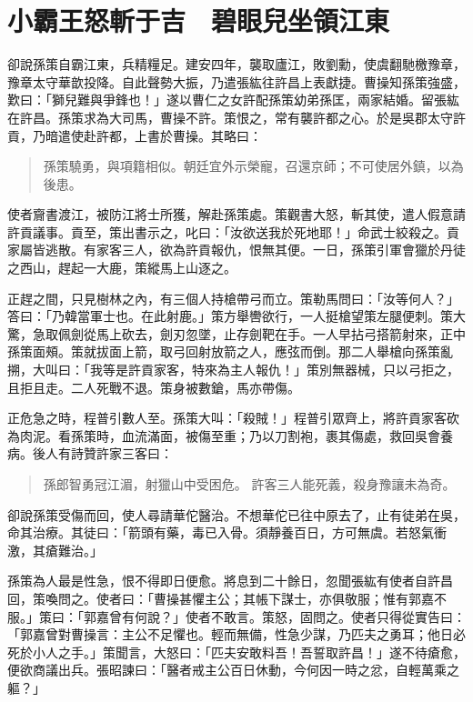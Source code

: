 
\chapter{小霸王怒斬于吉　碧眼兒坐領江東}

卻說孫策自霸江東，兵精糧足。建安四年，襲取廬江，敗劉勳，使虞翻馳檄豫章，豫章太守華歆投降。自此聲勢大振，乃遣張紘往許昌上表獻捷。曹操知孫策強盛，歎曰：「獅兒難與爭鋒也！」遂以曹仁之女許配孫策幼弟孫匡，兩家結婚。留張紘在許昌。孫策求為大司馬，曹操不許。策恨之，常有襲許都之心。於是吳郡太守許貢，乃暗遣使赴許都，上書於曹操。其略曰：

\begin{quote}
孫策驍勇，與項籍相似。朝廷宜外示榮寵，召還京師；不可使居外鎮，以為後患。
\end{quote}

使者齎書渡江，被防江將士所獲，解赴孫策處。策觀書大怒，斬其使，遣人假意請許貢議事。貢至，策出書示之，叱曰：「汝欲送我於死地耶！」命武士絞殺之。貢家屬皆逃散。有家客三人，欲為許貢報仇，恨無其便。一日，孫策引軍會獵於丹徒之西山，趕起一大鹿，策縱馬上山逐之。

正趕之間，只見樹林之內，有三個人持槍帶弓而立。策勒馬問曰：「汝等何人？」答曰：「乃韓當軍士也。在此射鹿。」策方舉轡欲行，一人挺槍望策左腿便刺。策大驚，急取佩劍從馬上砍去，劍刃忽墜，止存劍靶在手。一人早拈弓搭箭射來，正中孫策面頰。策就拔面上箭，取弓回射放箭之人，應弦而倒。那二人舉槍向孫策亂搠，大叫曰：「我等是許貢家客，特來為主人報仇！」策別無器械，只以弓拒之，且拒且走。二人死戰不退。策身被數鎗，馬亦帶傷。

正危急之時，程普引數人至。孫策大叫：「殺賊！」程普引眾齊上，將許貢家客砍為肉泥。看孫策時，血流滿面，被傷至重；乃以刀割袍，裹其傷處，救回吳會養病。後人有詩贊許家三客曰：

\begin{quote}
孫郎智勇冠江湄，射獵山中受困危。
許客三人能死義，殺身豫讓未為奇。
\end{quote}

卻說孫策受傷而回，使人尋請華佗醫治。不想華佗已往中原去了，止有徒弟在吳，命其治療。其徒曰：「箭頭有藥，毒已入骨。須靜養百日，方可無虞。若怒氣衝激，其瘡難治。」

孫策為人最是性急，恨不得即日便愈。將息到二十餘日，忽聞張紘有使者自許昌回，策喚問之。使者曰：「曹操甚懼主公；其帳下謀士，亦俱敬服；惟有郭嘉不服。」策曰：「郭嘉曾有何說？」使者不敢言。策怒，固問之。使者只得從實告曰：「郭嘉曾對曹操言：主公不足懼也。輕而無備，性急少謀，乃匹夫之勇耳；他日必死於小人之手。」策聞言，大怒曰：「匹夫安敢料吾！吾誓取許昌！」遂不待瘡愈，便欲商議出兵。張昭諫曰：「醫者戒主公百日休動，今何因一時之忿，自輕萬乘之軀？」

